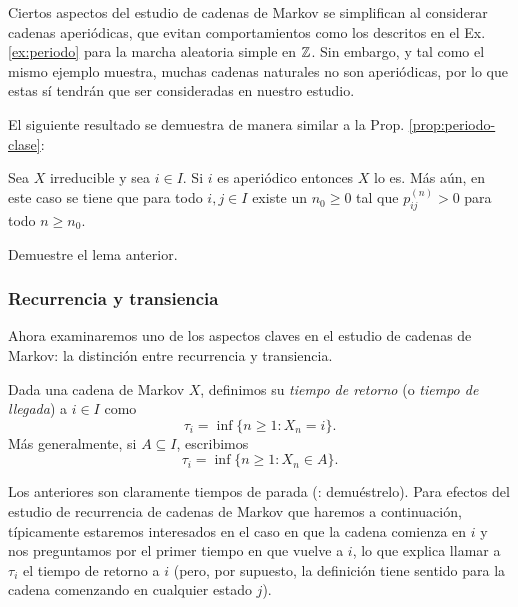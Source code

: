 Ciertos aspectos del estudio de cadenas de Markov se simplifican al considerar cadenas aperiódicas, que evitan comportamientos como los descritos en el Ex. \ref{ex:periodo} para la marcha aleatoria simple en $\mathbb{Z}$.
Sin embargo, y tal como el mismo ejemplo muestra, muchas cadenas naturales no son aperiódicas, por lo que estas sí tendrán que ser consideradas en nuestro estudio.

El siguiente resultado se demuestra de manera similar a la Prop. \ref{prop:periodo-clase}:

\begin{lem}
Sea $X$ irreducible y sea $i\in I$.
Si $i$ es aperiódico entonces $X$ lo es.
Más aún, en este caso se tiene que para todo $i,j\in I$ existe un $n_0\geq0$ tal que $p_{ij}^{(n)}>0$ para todo $n\geq n_0$.
\end{lem}

\begin{exer}
Demuestre el lema anterior.
\end{exer}

\subsubsection{Recurrencia y transiencia}

Ahora examinaremos uno de los aspectos claves en el estudio de cadenas de Markov: la distinción entre recurrencia y transiencia.


\begin{defn}
Dada una cadena de Markov $X$, definimos su \emph{tiempo de retorno} (o \emph{tiempo de llegada}) a $i\in I$ como
\[\tau_i=\inf\{n\geq1\!:X_n=i\}.\]
Más generalmente, si $A\subseteq I$, escribimos
\[\tau_i=\inf\{n\geq1\!:X_n\in A\}.\]
\end{defn}

Los anteriores son claramente tiempos de parada (\uexers: demuéstrelo).
Para efectos del estudio de recurrencia de cadenas de Markov que haremos a continuación, típicamente estaremos interesados en el caso en que la cadena comienza en $i$ y nos preguntamos por el primer tiempo en que vuelve a $i$, lo que explica llamar a $\tau_i$ el tiempo de retorno a $i$ (pero, por supuesto, la definición tiene sentido para la cadena comenzando en cualquier estado $j$).

